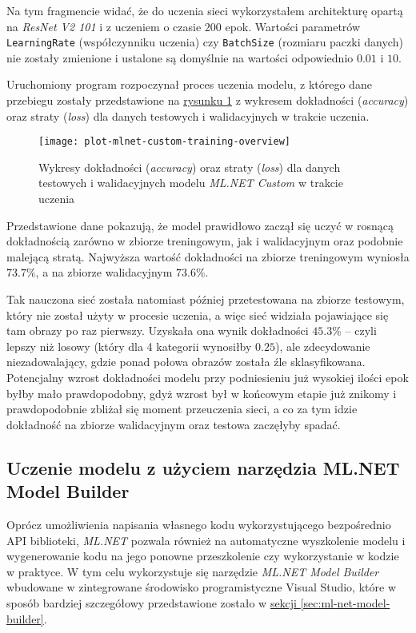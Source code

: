 Na tym fragmencie widać, że do uczenia sieci wykorzystałem architekturę opartą na \emph{ResNet V2 101} i z uczeniem o czasie $200$ epok.
Wartości parametrów \lstinline{LearningRate} (współczynniku uczenia) czy \lstinline{BatchSize} (rozmiaru paczki danych) nie zostały zmienione i ustalone są domyślnie na wartości odpowiednio $0.01$ i $10$.

Uruchomiony program rozpoczynał proces uczenia modelu, z którego dane przebiegu zostały przedstawione na \hyperref[fig:plot-mlnet-custom-training-overview]{rysunku \ref*{fig:plot-mlnet-custom-training-overview}} z wykresem dokładności (\emph{accuracy}) oraz straty (\emph{loss}) dla danych testowych i walidacyjnych w trakcie uczenia.

\begin{figure}[ht]
  \texttt{[image: plot-mlnet-custom-training-overview]}
  \caption[Wykresy statystyk modelu ML.NET Custom w trakcie uczenia]{Wykresy dokładności (\emph{accuracy}) oraz straty (\emph{loss}) dla danych testowych i walidacyjnych modelu \emph{ML.NET Custom} w trakcie uczenia}
  \label{fig:plot-mlnet-custom-training-overview}
\end{figure}

Przedstawione dane pokazują, że model prawidłowo zaczął się uczyć w rosnącą dokładnością zarówno w zbiorze treningowym, jak i walidacyjnym oraz podobnie malejącą stratą.
Najwyższa wartość dokładności na zbiorze treningowym wyniosła $73.7\%$, a na zbiorze walidacyjnym $73.6\%$.

Tak nauczona sieć została natomiast później przetestowana na zbiorze testowym, który nie został użyty w procesie uczenia, a więc sieć widziała pojawiające się tam obrazy po raz pierwszy.
Uzyskała ona wynik dokładności $45.3\%$ -- czyli lepszy niż losowy (który dla 4 kategorii wynosiłby $0.25$), ale zdecydowanie niezadowalający, gdzie ponad połowa obrazów została źle sklasyfikowana.
Potencjalny wzrost dokładności modelu przy podniesieniu już wysokiej ilości epok byłby mało prawdopodobny, gdyż wzrost był w końcowym etapie już znikomy i prawdopodobnie zbliżał się moment przeuczenia sieci, a co za tym idzie dokładność na zbiorze walidacyjnym oraz testowa zaczęłyby spadać.

\subsection{Uczenie modelu z użyciem narzędzia ML.NET Model Builder}

Oprócz umożliwienia napisania własnego kodu wykorzystującego bezpośrednio API biblioteki, \emph{ML.NET} pozwala również na automatyczne wyszkolenie modelu i wygenerowanie kodu na jego ponowne przeszkolenie czy wykorzystanie w kodzie w praktyce.
W tym celu wykorzystuje się narzędzie \emph{ML.NET Model Builder} wbudowane w zintegrowane środowisko programistyczne Visual Studio, które w sposób bardziej szczegółowy przedstawione zostało w \hyperref[sec:ml-net-model-builder]{sekcji \ref*{sec:ml-net-model-builder}}.


